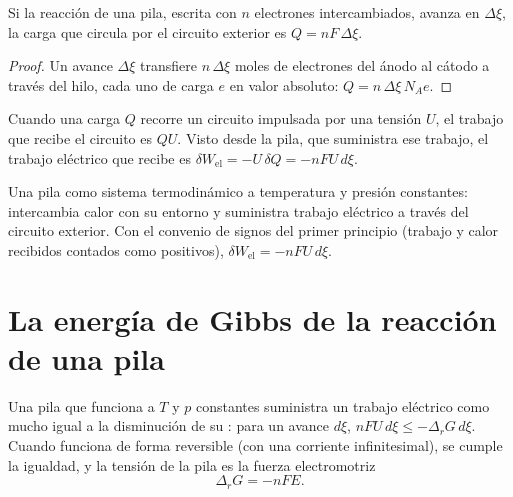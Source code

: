 \begin{proposition}\label{prop:b2:cell-thermodynamics:charge}
Si la reacción de una pila, escrita con $n$ electrones intercambiados, avanza en
$\Delta\xi$, la carga que circula por el circuito exterior es $Q =
nF\,\Delta\xi$.
\end{proposition}

\begin{proof}
Un avance $\Delta\xi$ transfiere $n\,\Delta\xi$ moles de electrones del
ánodo al cátodo a través del hilo, cada uno de carga $e$ en valor absoluto:
$Q = n\,\Delta\xi\,N_A e$.
\end{proof}

Cuando una carga $Q$ recorre un circuito impulsada por una tensión $U$, el trabajo
que recibe el circuito es $QU$. Visto desde la pila, que suministra ese trabajo,
el trabajo eléctrico que recibe es $\delta W_{\text{el}} = -U\,\delta Q = -nFU\,
d\xi$.

\begin{omfigure}

{\small Una pila como sistema termodinámico a temperatura y presión constantes:
intercambia calor con su entorno y suministra trabajo eléctrico a través
del circuito exterior. Con el convenio de signos del primer principio (trabajo y calor
recibidos contados como positivos), $\delta W_{\text{el}} = -nFU\,d\xi$.}
\end{omfigure}

\section{La energía de Gibbs de la reacción de una pila}

\begin{theorem}\label{thm:b2:cell-thermodynamics:delta-g-nfe}
Una pila que funciona a $T$ y $p$ constantes suministra un trabajo eléctrico como mucho
igual a la disminución de su : para un avance $d\xi$,
$nFU\,d\xi \leq -\Delta_r G\,d\xi$. Cuando funciona de forma reversible (con una
corriente infinitesimal), se cumple la igualdad, y la tensión de la pila es la
fuerza electromotriz
\[
  \Delta_r G = -nFE .
\]
\end{theorem}

